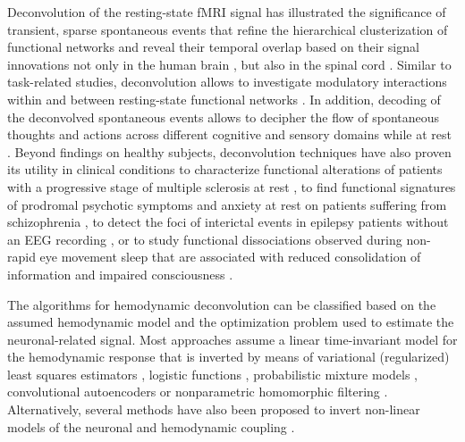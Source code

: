 Deconvolution of the resting-state fMRI signal has illustrated the significance
of transient, sparse spontaneous events
\citep{Petridou2012PeriodsrestfMRI,Allan2015FunctionalConnectivityMRI} that
refine the hierarchical clusterization of functional networks
\citep{Karahanoglu2013TotalactivationfMRI} and reveal their temporal overlap
based on their signal innovations not only in the human brain
\citep{Karahanoglu2015Transientbrainactivity}, but also in the spinal cord
\citep{Kinany2020DynamicFunctionalConnectivity}. Similar to task-related
studies, deconvolution allows to investigate modulatory interactions within and
between resting-state functional networks
\citep{Di2013ModulatoryInteractionsResting,Di2015Characterizationsrestingstate}.
In addition, decoding of the deconvolved spontaneous events allows to decipher
the flow of spontaneous thoughts and actions across different cognitive and
sensory domains while at rest
\citep{Karahanoglu2015Transientbrainactivity,GonzalezCastillo2019Imagingspontaneousflow,Tan_2017}.
Beyond findings on healthy subjects, deconvolution techniques have also proven
its utility in clinical conditions to characterize functional alterations of
patients with a progressive stage of multiple sclerosis at rest
\citep{Bommarito2020Alteredanteriordefault}, to find functional signatures
of prodromal psychotic symptoms and anxiety at rest on patients suffering from
schizophrenia \citep{Zoeller2019Largescalebrain}, to detect the foci of
interictal events in epilepsy patients without an EEG recording
\citep{Lopes2012Detectionepilepticactivity,Karahanoglu2013Spatialmappinginterictal},
or to study functional dissociations observed during non-rapid eye movement
sleep that are associated with reduced consolidation of information and impaired
consciousness \citep{Tarun2020NREMsleepstages}.

The algorithms for hemodynamic deconvolution can be classified based on the
assumed hemodynamic model and the optimization problem used to estimate the
neuronal-related signal. Most approaches assume a linear time-invariant model
for the hemodynamic response that is inverted by means of variational
(regularized) least squares estimators
\citep{Glover1999DeconvolutionImpulseResponse,Gitelman2003Modelingregionalpsychophysiologic,
Gaudes2010Detectioncharacterizationsingle,Gaudes2012Structuredsparsedeconvolution,
Gaudes2013Paradigmfreemapping,CaballeroGaudes2019deconvolutionalgorithmmulti,
HernandezGarcia2011Neuronaleventdetection,Karahanoglu2013TotalactivationfMRI,
Cherkaoui2019SparsitybasedBlind,Costantini2021ParadigmFreeRegularization,
Huetel2021Hemodynamicmatrixfactorization},
logistic functions
\citep{Bush2013Decodingneuralevents,Bush2015deconvolutionbasedapproach,
Loula2018DecodingfMRIactivity},
probabilistic mixture models \citep{Pidnebesna2019EstimatingSparseNeuronal},
convolutional autoencoders \citep{Huetel2018NeuralActivationEstimation} or
nonparametric homomorphic filtering
\citep{Sreenivasan2015NonparametricHemodynamicDeconvolution}. Alternatively,
several methods have also been proposed to invert non-linear models of the
neuronal and hemodynamic coupling
\citep{Riera2004statespacemodel,Friston2008DEMvariationaltreatment,
Havlicek2011Dynamicmodelingneuronal,Aslan2016Jointstateparameter,
Madi2017HybridCubatureKalman,ruizeuler2018nonlinear}.

